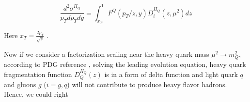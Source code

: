 \begin{equation}
\frac{d^2\sigma^{H_Q}}{p_T dp_T dy} = \int_{x_T}^1 F^Q(p_T/z, y) D_{i}^{H_Q}(z,\mu^2) dz
\end{equation}

Here $x_T = \frac{2p_T}{\sqrt s}$ \cite{HadronScale}.

Now if we consider a factorization scaling near the heavy quark mass $\mu^2 \rightarrow m_Q^2$, according to PDG reference \cite{AlphaTheoEx}, solving the leading evolution equation, heavy quark fragmentation function $D_Q^{H_Q}(z)$ is in a form of delta function and light quark $q$ and gluons $g$ ($i = g, q$) will not contribute to produce heavy flavor hadrons. Hence, we could right

